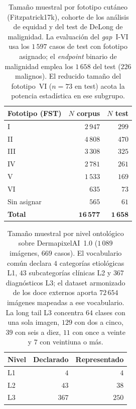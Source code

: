 \begin{table}[htbp]
\centering
\footnotesize
\caption{Tamaño muestral por fototipo cutáneo (Fitzpatrick17k),
cohorte de los análisis de equidad y del test de DeLong de
malignidad. La evaluación del \emph{gap}~I-VI usa los $1\,597$ casos
de test con fototipo asignado; el \emph{endpoint} binario de
malignidad emplea los $1\,658$ del test ($226$ malignos). El reducido
tamaño del fototipo~VI ($n = 73$ en test) acota la potencia
estadística en ese subgrupo.}
\label{tab:muestral-fst}
\begin{tabular}{lrr}
\hline
Fototipo (FST) & $N$ corpus & $N$ test \\
\hline
I    & $2\,947$ & $299$ \\
II   & $4\,808$ & $470$ \\
III  & $3\,308$ & $325$ \\
IV   & $2\,781$ & $261$ \\
V    & $1\,533$ & $169$ \\
VI   & $635$    & $73$  \\
Sin asignar & $565$ & $61$ \\
\hline
\textbf{Total} & $\mathbf{16\,577}$ & $\mathbf{1\,658}$ \\
\hline
\end{tabular}
\end{table}

\begin{table}[htbp]
\centering
\footnotesize
\caption{Tamaño muestral por nivel ontológico sobre DermapixelAI~1.0
($1\,089$ imágenes, $669$ casos). El vocabulario común declara $4$
categorías etiológicas L1, $43$ subcategorías clínicas L2 y $367$
diagnósticos L3; el dataset armonizado de los doce externos aporta
$72\,654$ imágenes mapeadas a ese vocabulario. La long tail L3
concentra $64$ clases con una sola imagen, $129$ con dos a cinco, $39$
con seis a diez, $11$ con once a veinte y $7$ con veintiuna o más.}
\label{tab:muestral-nivel}
\begin{tabular}{lrr}
\hline
Nivel & Declarado & Representado \\
\hline
L1 & $4$   & $4$ \\
L2 & $43$  & $38$ \\
L3 & $367$ & $250$ \\
\hline
\end{tabular}
\end{table}

